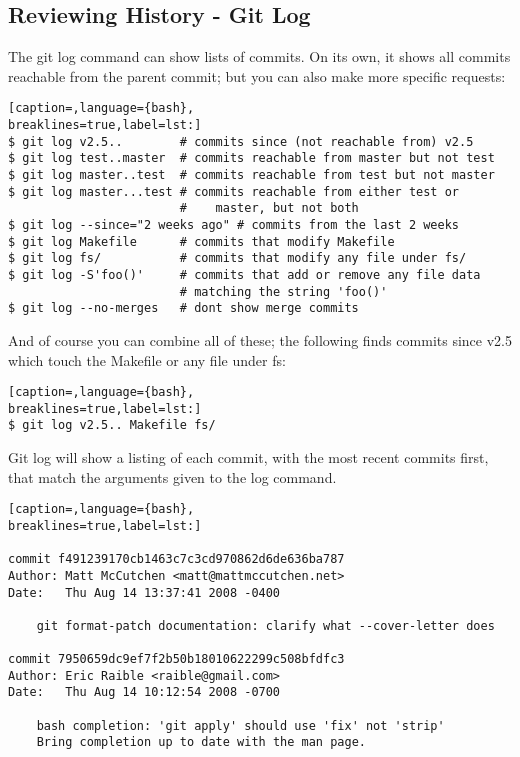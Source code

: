\subsection{Reviewing History - Git Log}
The git log command can show lists of commits. On its own, it shows all commits
reachable from the parent commit; but you can also make more specific requests:
\lstset{basicstyle=\scriptsize, numbers=none, captionpos=b, tabsize=4}
\begin{lstlisting}[caption=,language={bash},
breaklines=true,label=lst:]
$ git log v2.5..        # commits since (not reachable from) v2.5
$ git log test..master  # commits reachable from master but not test
$ git log master..test  # commits reachable from test but not master
$ git log master...test # commits reachable from either test or
                        #    master, but not both
$ git log --since="2 weeks ago" # commits from the last 2 weeks
$ git log Makefile      # commits that modify Makefile
$ git log fs/           # commits that modify any file under fs/
$ git log -S'foo()'     # commits that add or remove any file data
                        # matching the string 'foo()'
$ git log --no-merges   # dont show merge commits
\end{lstlisting}

And of course you can combine all of these; the following finds commits since
v2.5 which touch the Makefile or any file under fs:
\lstset{basicstyle=\scriptsize, numbers=none, captionpos=b, tabsize=4}
\begin{lstlisting}[caption=,language={bash},
breaklines=true,label=lst:]
$ git log v2.5.. Makefile fs/
\end{lstlisting}

Git log will show a listing of each commit, with the most recent commits first,
that match the arguments given to the log command.
\lstset{basicstyle=\scriptsize, numbers=none, captionpos=b, tabsize=4}
\begin{lstlisting}[caption=,language={bash},
breaklines=true,label=lst:]

commit f491239170cb1463c7c3cd970862d6de636ba787
Author: Matt McCutchen <matt@mattmccutchen.net>
Date:   Thu Aug 14 13:37:41 2008 -0400

    git format-patch documentation: clarify what --cover-letter does

commit 7950659dc9ef7f2b50b18010622299c508bfdfc3
Author: Eric Raible <raible@gmail.com>
Date:   Thu Aug 14 10:12:54 2008 -0700

    bash completion: 'git apply' should use 'fix' not 'strip'
    Bring completion up to date with the man page.
\end{lstlisting}

